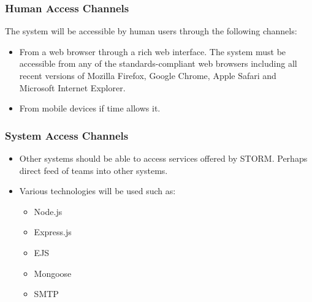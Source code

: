 \subsubsection{Human Access Channels}
The system will be accessible by human users through the following channels:\par
\begin{itemize}
\item From a web browser through a rich web interface. The system must be accessible from any of the standards-compliant web browsers including all recent versions of Mozilla Firefox, Google Chrome, Apple Safari and Microsoft Internet Explorer.
\item From mobile devices if time allows it.
\end{itemize}
\subsubsection{System Access Channels}
\begin{itemize}
\item Other systems should be able to access services offered by STORM. Perhaps direct feed of teams into other systems.
\item Various technologies will be used such as:
	\begin{itemize}
	\item Node.js
	\item Express.js
	\item EJS
	\item Mongoose
	\item SMTP
	\end{itemize}
\end{itemize}